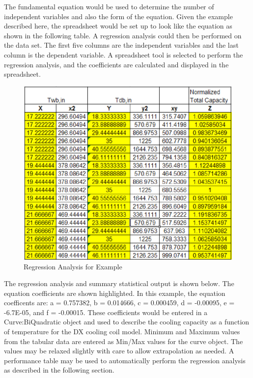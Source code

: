The fundamental equation would be used to determine the number of independent variables and also the form of the equation. Given the example described here, the spreadsheet would be set up to look like the equation as shown in the following table. A regression analysis could then be performed on the data set. The first five columns are the independent variables and the last column is the dependent variable. A spreadsheet tool is selected to perform the regression analysis, and the coefficients are calculated and displayed in the spreadsheet.

\begin{figure}[htbp]
\centering
\includegraphics{media/image7866.png}
\caption{Regression Analysis for Example \protect \label{fig:dx-cooling-data-normalized}}
\end{figure}

The regression analysis and summary statistical output is shown below. The equation coefficients are shown highlighted. In this example, the equation coefficents are: a = 0.757382, b = 0.014666, c = 0.000459, d = -0.00095, e = -6.7E-05, and f = -0.00015. These coefficients would be entered in a Curve:BiQuadratic object and used to describe the cooling capacity as a function of temperature for the DX cooling coil model. Minimum and Maximum values from the tabular data are entered as Min/Max values for the curve object. The values may be relaxed slightly with care to allow extrapolation as needed. A performance table may be used to automatically perform the regression analysis as described in the following section.

